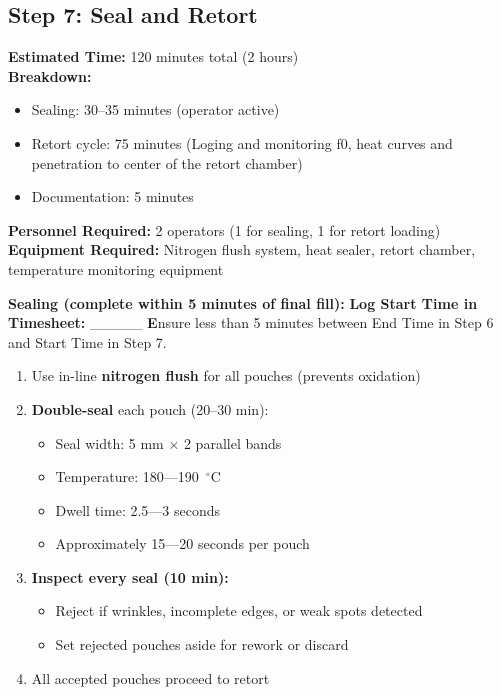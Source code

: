 {%

\subsection*{Step 7: Seal and 
Retort}

\textbf{Estimated Time:} 120 minutes total (2 hours) \\
\textbf{Breakdown:}
\begin{itemize}
\item Sealing: 30--35 minutes (operator active)
\item Retort cycle: 75 minutes (Loging and monitoring f0, heat curves and penetration to center of the retort chamber)
\item Documentation: 5 minutes
\end{itemize}
\textbf{Personnel Required:} 2 operators (1 for sealing, 1 for retort loading) \\
\textbf{Equipment Required:} Nitrogen flush system, heat sealer, retort chamber, temperature monitoring equipment

\vspace{0.5em}
\textbf{Sealing (complete within 5 minutes of final fill):}
\textbf{Log Start Time in Timesheet:} \_\_\_\_\_
\textbf Ensure less than 5 minutes between End Time in Step 6 and Start Time in Step 7. 
\begin{enumerate}[leftmargin=1.5em]
\item Use in-line \textbf{nitrogen flush} for all pouches (prevents oxidation)
\item \textbf{Double-seal} each pouch (20--30 min):
 
 \begin{itemize}
  \item Seal width: 5 mm $\times$ 2 parallel bands
  \item Temperature: 180---190~$^\circ$C
  \item Dwell time: 2.5---3 seconds
  \item Approximately 15---20 seconds per pouch
  \end{itemize}
\item \textbf{Inspect every seal (10 min):}
  \begin{itemize}
  \item Reject if wrinkles, incomplete edges, or weak spots detected
  \item Set rejected pouches aside for rework or discard
  \end{itemize}
\item All accepted pouches proceed to retort
\end{enumerate}

}
